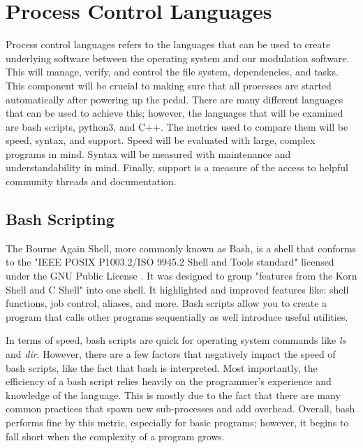 \section{Process Control Languages}
Process control languages refers to the languages that can be used to create underlying software between the operating system and our modulation software.
This will manage, verify, and control the file system, dependencies, and tasks.
This component will be crucial to making sure that all processes are started automatically after powering up the pedal.
There are many different languages that can be used to achieve this; however, the languages that will be examined are bash scripts, python3, and C++. 
The metrics used to compare them will be speed, syntax, and support.
Speed will be evaluated with large, complex programs in mind.
Syntax will be measured with maintenance and understandability in mind.
Finally, support is a measure of the access to helpful community threads and documentation.
        
        
        
    \subsection{Bash Scripting}
        The Bourne Again Shell, more commonly known as Bash, is a shell that conforms to the "IEEE POSIX P1003.2/ISO 9945.2 Shell and Tools standard" licensed under the GNU Public License \cite{bib:bash}.
        It was designed to group "features from the Korn Shell and C Shell" into one shell.
        It highlighted and improved features like: shell functions, job control, aliases, and more\cite{bib:bash}.
        Bash scripts allow you to create a program that calls other programs sequentially as well introduce useful utilities.
        
        In terms of speed, bash scripts are quick for operating system commands like \emph{ls} and \emph{dir}.
        However, there are a few factors that negatively impact the speed of bash scripts, like the fact that bash is interpreted\cite{bib:bashMan}.
        Most importantly, the efficiency of a bash script relies heavily on the programmer's experience and knowledge of the language.
        This is mostly due to the fact that there are many common practices that spawn new sub-processes and add overhead.
        Overall, bash performs fine by this metric, especially for basic programs; however, it begins to fall short when the complexity of a program grows.
        
